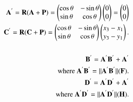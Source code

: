 \documentclass[journal,12pt,twocolumn]{IEEEtran}
\begin{document}
\begin{align}
\begin{split}
\mathbf{A^{'}} = \mathbf{R}(\mathbf{A+P})=\begin{pmatrix}\cos \theta & -\sin \theta\\\sin \theta & \cos \theta\end{pmatrix}\begin{pmatrix}0\\0\end{pmatrix} = \begin{pmatrix}0\\0\end{pmatrix} \\
\mathbf{C^{'}} = \mathbf{R}(\mathbf{C+P})=\begin{pmatrix}\cos \theta & -\sin \theta\\\sin \theta & \cos \theta\end{pmatrix}\begin{pmatrix}x_3-x_1\\y_3-y_1\end{pmatrix}.\\
\\
\mathbf{B^{'}}=\mathbf{A^{'}B^{'}}+\mathbf{A^{'}}\\
\text{where }
\mathbf{A^{'}B^{'}} = ||\mathbf{A^{'}B^{'}}||(\mathbf{F}).\\
\mathbf{D^{'}}=\mathbf{A^{'}D^{'}}+\mathbf{A^{'}}\\
\text{where }
\mathbf{A^{'}D^{'}} = ||\mathbf{A^{'}D^{'}}||(\mathbf{H}).
\end{split}
\end{align}
\end{document}

